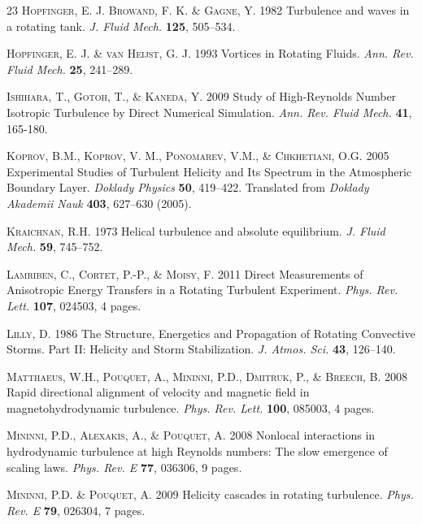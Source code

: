 \documentclass[aps,amsmath,amssymb,floatfix,showpacs]{revtex4}
\begin{document}
\begin{thebibliography}{23}
\textsc{Hopfinger, E. J. Browand, F. K.  \& Gagne, Y.  }  
1982 Turbulence and waves in a rotating tank. 
\emph{J. Fluid Mech.} \textbf{125}, 505--534.

 \textsc{Hopfinger, E. J. \& van Heijst, G. J.}
1993 Vortices in Rotating Fluids. 
\emph{Ann. Rev. Fluid Mech.} \textbf{25}, 241--289.

\textsc{Ishihara,  T., Gotoh, T., \& Kaneda, Y.}
2009 Study of High-Reynolds Number Isotropic Turbulence by Direct Numerical Simulation.
\emph{Ann. Rev. Fluid Mech.}
\textbf{41}, 165-180.

\textsc{Koprov, B.M., Koprov, V. M., Ponomarev, V.M., \& Chkhetiani, O.G.}
2005 Experimental Studies of Turbulent Helicity and Its Spectrum in the Atmospheric Boundary Layer.
\emph{Doklady Physics}
\textbf{50}, 419--422. Translated from \emph{Doklady Akademii Nauk} {\bf 403}, 627--630 (2005).

\textsc{Kraichnan, R.H.}
1973 Helical turbulence and absolute equilibrium.
\emph{J. Fluid Mech.} \textbf{59}, 745--752.

\textsc{Lamriben, C., Cortet, P.-P., \& Moisy, F.}
2011 Direct Measurements of Anisotropic Energy Transfers in a Rotating Turbulent Experiment.
\emph{Phys. Rev. Lett.} \textbf{107}, 024503, 4 pages.

\textsc{Lilly, D.}
1986 The Structure, Energetics and Propagation of Rotating Convective Storms. Part II: Helicity and Storm Stabilization.
\emph{J. Atmos. Sci.} \textbf{43}, 126--140.

\textsc{Matthaeus, W.H., Pouquet, A., Mininni, P.D., Dmitruk, P., \& Breech, B.}
2008 Rapid directional alignment of velocity and magnetic field in 
magnetohydrodynamic turbulence.
\emph{Phys. Rev. Lett.} \textbf{100}, 085003, 4 pages.

\textsc{Mininni, P.D., Alexakis, A., \& Pouquet, A.}
2008 Nonlocal interactions in hydrodynamic turbulence at high Reynolds numbers: The slow emergence of scaling laws.
\emph{Phys. Rev. E} \textbf{77}, 036306, 9 pages.

\textsc{Mininni, P.D. \& Pouquet, A.}
2009 Helicity cascades in rotating turbulence.
\emph{Phys. Rev. E} \textbf{79}, 026304, 7 pages.


\end{thebibliography}
\end{document}
